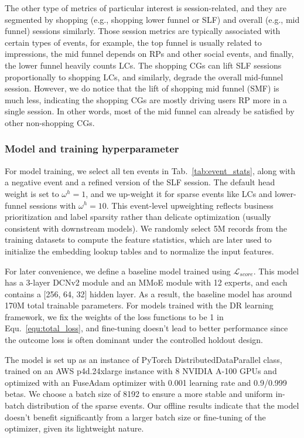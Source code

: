 \documentclass[sigconf, authorversion]{acmart}
\begin{document}
The other type of metrics of particular interest is session-related, and they are segmented by shopping (e.g., shopping lower funnel or SLF) and overall (e.g., mid funnel) sessions similarly. Those session metrics are typically associated with certain types of events, for example, the top funnel is usually related to impressions, the mid funnel depends on RPs and other social events, and finally, the lower funnel heavily counts LCs. The shopping CGs can lift SLF sessions proportionally to shopping LCs, and similarly, degrade the overall mid-funnel session. However, we do notice that the lift of shopping mid funnel (SMF) is much less, indicating the shopping CGs are mostly driving users RP more in a single session. In other words, most of the mid funnel can already be satisfied by other non-shopping CGs.

\subsubsection{Model and training hyperparameter}
For model training, we select all ten events in Tab.~\ref{tab:event_stats}, along with a negative event and a refined version of the SLF session. The default head weight is set to $\omega^h=1$, and we up-weight it for sparse events like LCs and lower-funnel sessions with $\omega^h=10$. This event-level upweighting reflects business prioritization and label sparsity rather than delicate optimization (usually consistent with downstream models). We randomly select 5M records from the training datasets to compute the feature statistics, which are later used to initialize the embedding lookup tables and to normalize the input features. 

For later convenience, we define a baseline model trained using $\mathcal{L}_{score}$. This model has a 3-layer DCNv2 module and an MMoE module with 12 experts, and each contains a [256, 64, 32] hidden layer. As a result, the baseline model has around 170M total trainable parameters. For models trained with the DR learning framework, we fix the weights of the loss functions to be 1 in Equ.~\ref{equ:total_loss}, and fine-tuning doesn't lead to better performance since the outcome loss is often dominant under the controlled holdout design.

The model is set up as an instance of PyTorch DistributedDataParallel class, trained on an AWS p4d.24xlarge instance with 8 NVIDIA A-100 GPUs and optimized with an FuseAdam optimizer with 0.001 learning rate and 0.9/0.999 betas. We choose a batch size of 8192 to ensure a more stable and uniform in-batch distribution of the sparse events. Our offline results indicate that the model doesn't benefit significantly from a larger batch size or fine-tuning of the optimizer, given its lightweight nature.
\end{document}
